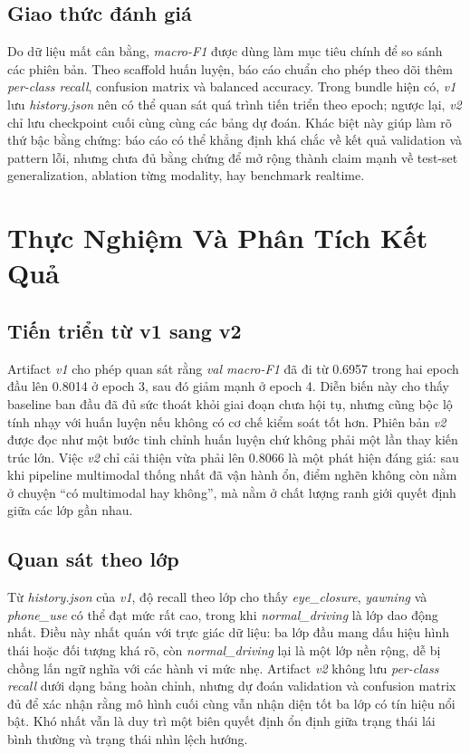\documentclass[conference,a4paper]{IEEEtran}
\begin{document}
\subsection{Giao thức đánh giá}
Do dữ liệu mất cân bằng, \textit{macro-F1} được dùng làm mục tiêu chính để so sánh các phiên bản. Theo scaffold huấn luyện, báo cáo chuẩn cho phép theo dõi thêm \textit{per-class recall}, confusion matrix và balanced accuracy. Trong bundle hiện có, \textit{v1} lưu \textit{history.json} nên có thể quan sát quá trình tiến triển theo epoch; ngược lại, \textit{v2} chỉ lưu checkpoint cuối cùng cùng các bảng dự đoán. Khác biệt này giúp làm rõ thứ bậc bằng chứng: báo cáo có thể khẳng định khá chắc về kết quả validation và pattern lỗi, nhưng chưa đủ bằng chứng để mở rộng thành claim mạnh về test-set generalization, ablation từng modality, hay benchmark realtime.

\section[Thuc Nghiem Va Phan Tich Ket Qua]{Thực Nghiệm Và Phân Tích Kết Quả}
\subsection{Tiến triển từ v1 sang v2}
Artifact \textit{v1} cho phép quan sát rằng \textit{val macro-F1} đã đi từ 0.6957 trong hai epoch đầu lên 0.8014 ở epoch 3, sau đó giảm mạnh ở epoch 4. Diễn biến này cho thấy baseline ban đầu đã đủ sức thoát khỏi giai đoạn chưa hội tụ, nhưng cũng bộc lộ tính nhạy với huấn luyện nếu không có cơ chế kiểm soát tốt hơn. Phiên bản \textit{v2} được đọc như một bước tinh chỉnh huấn luyện chứ không phải một lần thay kiến trúc lớn. Việc \textit{v2} chỉ cải thiện vừa phải lên 0.8066 là một phát hiện đáng giá: sau khi pipeline multimodal thống nhất đã vận hành ổn, điểm nghẽn không còn nằm ở chuyện ``có multimodal hay không'', mà nằm ở chất lượng ranh giới quyết định giữa các lớp gần nhau.

\subsection{Quan sát theo lớp}
Từ \textit{history.json} của \textit{v1}, độ recall theo lớp cho thấy \textit{eye\_closure}, \textit{yawning} và \textit{phone\_use} có thể đạt mức rất cao, trong khi \textit{normal\_driving} là lớp dao động nhất. Điều này nhất quán với trực giác dữ liệu: ba lớp đầu mang dấu hiệu hình thái hoặc đối tượng khá rõ, còn \textit{normal\_driving} lại là một lớp nền rộng, dễ bị chồng lấn ngữ nghĩa với các hành vi mức nhẹ. Artifact \textit{v2} không lưu \textit{per-class recall} dưới dạng bảng hoàn chỉnh, nhưng dự đoán validation và confusion matrix đủ để xác nhận rằng mô hình cuối cùng vẫn nhận diện tốt ba lớp có tín hiệu nổi bật. Khó nhất vẫn là duy trì một biên quyết định ổn định giữa trạng thái lái bình thường và trạng thái nhìn lệch hướng.
\end{document}
